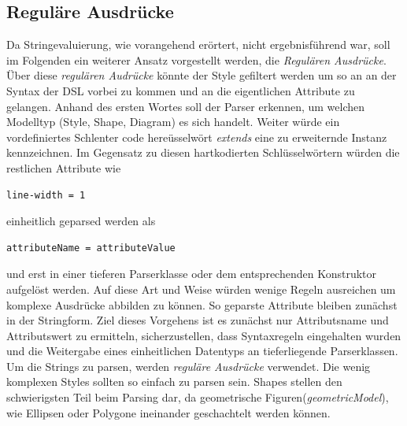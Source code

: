 \subsection{Reguläre Ausdrücke}Da Stringevaluierung, wie vorangehend erörtert, nicht ergebnisführend war, soll im Folgenden ein weiterer Ansatz vorgestellt werden,
die \textit{Regulären Ausdrücke}. Über diese \textit{regulären Audrücke} könnte der Style gefiltert werden um so an an der Syntax der DSL vorbei zu kommen und an die eigentlichen Attribute zu gelangen.
Anhand des ersten Wortes soll der Parser erkennen, um welchen Modelltyp (Style, Shape, Diagram) es sich handelt. 
Weiter würde ein vordefiniertes Schlenter code hereüsselwört \textit{extends} eine zu erweiternde Instanz kennzeichnen.
Im Gegensatz zu diesen hartkodierten Schlüsselwörtern würden die restlichen Attribute wie
\begin{lstlisting}[style=spray, aboveskip=0pt]
line-width = 1
\end{lstlisting} einheitlich geparsed werden als
\begin{lstlisting}[style=spray, aboveskip=0pt]
attributeName = attributeValue
\end{lstlisting} und erst in einer tieferen Parserklasse oder dem entsprechenden Konstruktor aufgelöst werden. Auf diese Art und Weise würden wenige Regeln ausreichen um komplexe Ausdrücke abbilden zu können. So geparste Attribute bleiben zunächst in der Stringform. Ziel dieses Vorgehens ist es zunächst nur Attributsname und Attributswert zu ermitteln, sicherzustellen, dass Syntaxregeln eingehalten wurden und die Weitergabe eines einheitlichen Datentyps an tieferliegende Parserklassen.
Um die Strings zu parsen, werden \textit{reguläre Ausdrücke} verwendet.
Die wenig komplexen Styles sollten so einfach zu parsen sein. Shapes stellen den schwierigsten Teil beim Parsing dar, da geometrische Figuren(\textit{geometricModel}), wie Ellipsen oder Polygone ineinander geschachtelt werden können.
